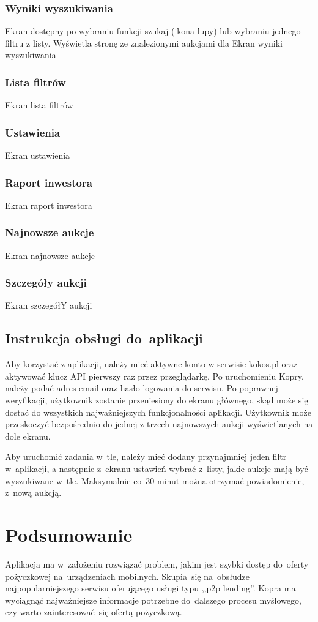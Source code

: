 \documentclass[a4paper,twoside,titlepage,openright]{book}
\begin{document}
\subsection{Wyniki wyszukiwania}
Ekran dostępny po wybraniu funkcji szukaj (ikona lupy) lub wybraniu jednego filtru z listy. Wyświetla stronę ze znalezionymi aukcjami dla 
{\color{red}Ekran wyniki wyszukiwania}
\subsection{Lista filtrów}
{\color{red}Ekran lista filtrów}
\subsection{Ustawienia}
{\color{red}Ekran ustawienia}
\subsection{Raport inwestora}
{\color{red}Ekran raport inwestora}
\subsection{Najnowsze aukcje}
{\color{red}Ekran najnowsze aukcje}
\subsection{Szczegóły aukcji}
{\color{red}Ekran szczegółY aukcji}
\section{Instrukcja obsługi do~aplikacji}
Aby korzystać z aplikacji, należy mieć aktywne konto w serwisie kokos.pl oraz aktywować klucz API pierwszy raz przez przeglądarkę. Po uruchomieniu Kopry, należy podać adres email oraz hasło logowania do serwisu. Po poprawnej weryfikacji, użytkownik zostanie przeniesiony do ekranu głównego, skąd może się dostać do wszystkich najważniejszych funkcjonalności aplikacji. Użytkownik może przeskoczyć bezpośrednio do jednej z trzech najnowszych aukcji wyświetlanych na dole ekranu.

Aby uruchomić zadania w~tle, należy mieć dodany przynajmniej jeden filtr w~aplikacji, a następnie z~ekranu ustawień wybrać z~listy, jakie aukcje mają być wyszukiwane w~tle. Maksymalnie co~30 minut można otrzymać powiadomienie, z~nową aukcją.

 
\chapter{Podsumowanie}
Aplikacja ma w~założeniu rozwiązać problem, jakim jest szybki dostęp do~oferty pożyczkowej na~urządzeniach mobilnych. Skupia~się na~obsłudze najpopularniejszego serwisu oferującego usługi typu ,,p2p lending''. Kopra ma wyciągnąć najważniejsze informacje potrzebne do~dalszego procesu myślowego, czy warto zainteresować~się ofertą pożyczkową. 
\end{document}
